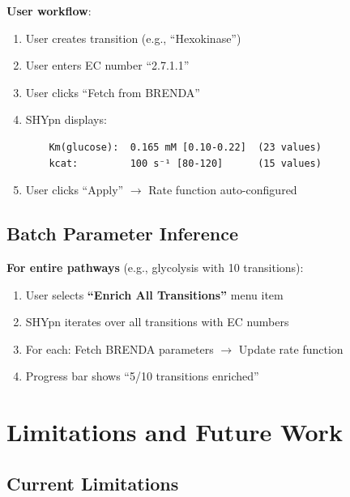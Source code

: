 \textbf{User workflow}:

\begin{enumerate}
    \item User creates transition (e.g., ``Hexokinase'')
    \item User enters EC number ``2.7.1.1''
    \item User clicks ``Fetch from BRENDA''
    \item SHYpn displays:
    \begin{verbatim}
    Km(glucose):  0.165 mM [0.10-0.22]  (23 values)
    kcat:         100 s⁻¹ [80-120]      (15 values)
    \end{verbatim}
    \item User clicks ``Apply'' $\to$ Rate function auto-configured
\end{enumerate}

\subsection{Batch Parameter Inference}
\label{subsec:batch-parameter-inference}

\textbf{For entire pathways} (e.g., glycolysis with 10 transitions):

\begin{enumerate}
    \item User selects \textbf{``Enrich All Transitions''} menu item
    \item SHYpn iterates over all transitions with EC numbers
    \item For each: Fetch BRENDA parameters $\to$ Update rate function
    \item Progress bar shows ``5/10 transitions enriched''
\end{enumerate}

\section{Limitations and Future Work}
\label{sec:brenda-limitations}

\subsection{Current Limitations}
\label{subsec:brenda-current-limitations}

